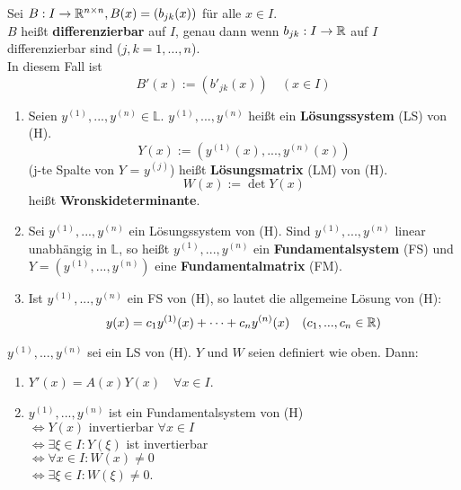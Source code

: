 \documentclass[a4paper,oneside,DIV15,BCOR12mm,chapterprefix=true,headings=onelinechapter]{scrbook}
\begin{document}
\begin{definition}
Sei $B : I \to \mathbb{R}^{n \times n}, B(x) = \left( b_{jk}(x) \right)$ für alle $x\in I$.\\ 
$B$ heißt \textbf{differenzierbar} auf $I$, genau dann wenn $b_{jk} : I \to \mathbb{R}$
auf $I$ differenzierbar sind ($j,k = 1,\ldots, n$).\\
In diesem Fall ist 
\[B'(x) := (b'_{jk}(x)) \quad (x\in I)\]
\end{definition}

\begin{definition}
\begin{enumerate}
\item Seien $y^{(1)}, ..., y^{(n)} \in \mathbb{L}$. $y^{(1)}, ..., y^{(n)}$ 
heißt ein \textbf{Lösungssystem} (LS) von (H). 
\[Y(x) := (y^{(1)}(x), ..., y^{(n)}(x))\]
(j-te Spalte von $Y$  =  $y^{(j)}$) heißt \textbf{Lösungsmatrix} (LM) von (H).
\[W(x) := \det Y(x)\] 
heißt \textbf{Wronskideterminante}.
\item Sei $y^{(1)}, ..., y^{(n)}$ ein Lösungssystem von (H). Sind 
$y^{(1)}, ..., y^{(n)}$ linear unabhängig in $\mathbb{L}$, so heißt 
$y^{(1)}, ..., y^{(n)}$ ein \textbf{Fundamentalsystem} (FS) und 
$Y = (y^{(1)}, ..., y^{(n)})$ eine \textbf{Fundamentalmatrix} (FM).
\item Ist $y^{(1)}, ..., y^{(n)}$ ein FS von (H), so lautet die allgemeine Lösung von (H): 
\[y(x) = c_1 y^{(1)}(x) + \cdots + c_n y^{(n)} (x) \quad (c_1, ..., c_n \in \mathbb{R})\]
\end{enumerate}
\end{definition}

\begin{satz}
$y^{(1)}, ..., y^{(n)}$ sei ein LS von (H). $Y$ und $W$ seien definiert wie oben. Dann:\begin{enumerate}
\item $Y'(x) = A(x)Y(x) \quad \forall x \in I$.
\item $y^{(1)}, ..., y^{(n)}$ ist ein Fundamentalsystem von (H)\\ $\iff Y(x) \text{ invertierbar } \forall x \in I$ \\ $\iff \exists \xi \in I: Y(\xi )$ ist invertierbar \\ $\iff \forall x \in I: W(x) \neq 0$ \\ $\iff \exists \xi \in I: W(\xi ) \neq 0$.
\end{enumerate}
\end{satz}
\end{document}
